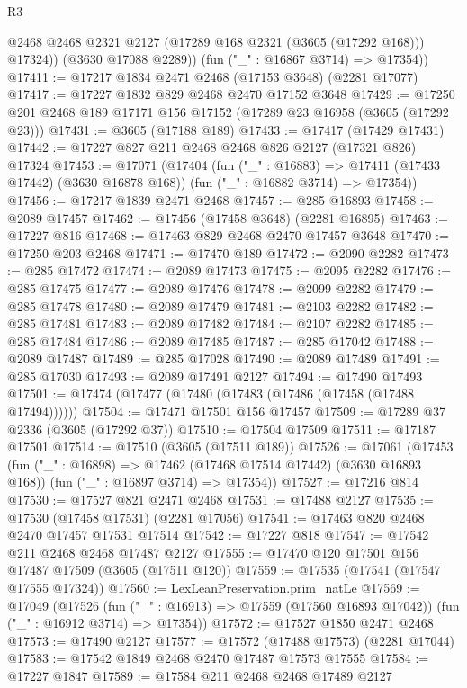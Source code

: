 \begin{lexlean}{R3}
\begin{coremodule}
            @2468
            @2468
            @2321
            @2127
            (@17289 @168 @2321 (@3605 (@17292 @168)))
            @17324))
        (@3630 @17088 @2289))
      (fun ("_" : @16867 @3714) => @17354))
@17411 := @17217 @1834 @2471 @2468 (@17153 @3648) (@2281 @17077)
@17417 := @17227 @1832 @829 @2468 @2470 @17152 @3648
@17429 := @17250 @201 @2468 @189 @17171 @156 @17152 (@17289 @23 @16958 (@3605 (@17292 @23)))
@17431 := @3605 (@17188 @189)
@17433 := @17417 (@17429 @17431)
@17442 := @17227 @827 @211 @2468 @2468 @826 @2127 (@17321 @826) @17324
@17453 := @17071
    (@17404
      (fun ("_" : @16883) => @17411 (@17433 @17442) (@3630 @16878 @168))
      (fun ("_" : @16882 @3714) => @17354))
@17456 := @17217 @1839 @2471 @2468
@17457 := @285 @16893
@17458 := @2089 @17457
@17462 := @17456 (@17458 @3648) (@2281 @16895)
@17463 := @17227 @816
@17468 := @17463 @829 @2468 @2470 @17457 @3648
@17470 := @17250 @203 @2468
@17471 := @17470 @189
@17472 := @2090 @2282
@17473 := @285 @17472
@17474 := @2089 @17473
@17475 := @2095 @2282
@17476 := @285 @17475
@17477 := @2089 @17476
@17478 := @2099 @2282
@17479 := @285 @17478
@17480 := @2089 @17479
@17481 := @2103 @2282
@17482 := @285 @17481
@17483 := @2089 @17482
@17484 := @2107 @2282
@17485 := @285 @17484
@17486 := @2089 @17485
@17487 := @285 @17042
@17488 := @2089 @17487
@17489 := @285 @17028
@17490 := @2089 @17489
@17491 := @285 @17030
@17493 := @2089 @17491 @2127
@17494 := @17490 @17493
@17501 := @17474 (@17477 (@17480 (@17483 (@17486 (@17458 (@17488 @17494))))))
@17504 := @17471 @17501 @156 @17457
@17509 := @17289 @37 @2336 (@3605 (@17292 @37))
@17510 := @17504 @17509
@17511 := @17187 @17501
@17514 := @17510 (@3605 (@17511 @189))
@17526 := @17061
    (@17453
      (fun ("_" : @16898) => @17462 (@17468 @17514 @17442) (@3630 @16893 @168))
      (fun ("_" : @16897 @3714) => @17354))
@17527 := @17216 @814
@17530 := @17527 @821 @2471 @2468
@17531 := @17488 @2127
@17535 := @17530 (@17458 @17531) (@2281 @17056)
@17541 := @17463 @820 @2468 @2470 @17457 @17531 @17514
@17542 := @17227 @818
@17547 := @17542 @211 @2468 @2468 @17487 @2127
@17555 := @17470 @120 @17501 @156 @17487 @17509 (@3605 (@17511 @120))
@17559 := @17535 (@17541 (@17547 @17555 @17324))
@17560 := LexLeanPreservation.prim_natLe
@17569 := @17049
    (@17526
      (fun ("_" : @16913) => @17559 (@17560 @16893 @17042))
      (fun ("_" : @16912 @3714) => @17354))
@17572 := @17527 @1850 @2471 @2468
@17573 := @17490 @2127
@17577 := @17572 (@17488 @17573) (@2281 @17044)
@17583 := @17542 @1849 @2468 @2470 @17487 @17573 @17555
@17584 := @17227 @1847
@17589 := @17584 @211 @2468 @2468 @17489 @2127

\end{coremodule}
\end{lexlean}
